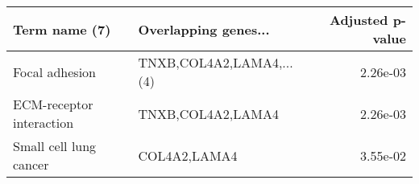 \begin{tabular}{llr}
\toprule
           Term name (7) &     Overlapping genes... &  Adjusted p-value \\
\midrule
          Focal adhesion & TNXB,COL4A2,LAMA4,...(4) &          2.26e-03 \\
ECM-receptor interaction &        TNXB,COL4A2,LAMA4 &          2.26e-03 \\
  Small cell lung cancer &             COL4A2,LAMA4 &          3.55e-02 \\
\bottomrule
\end{tabular}
